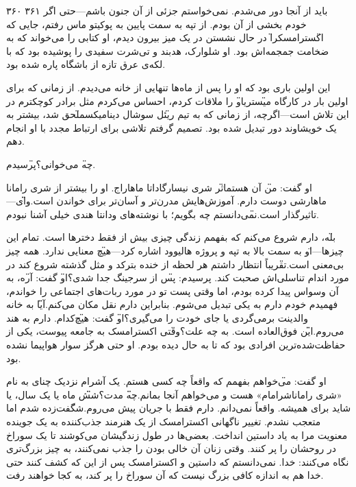 ۳۶۰  
۳۶۱  
باید از آنجا دور می‌شدم. نمی‌خواستم جزئی از آن جنون باشم—حتی اگر خودم بخشی از آن بودم. از تپه به سمت پایین به پوکیتو ماس رفتم، جایی که \"اکسترامسک\" را در حال نشستن در یک میز بیرون دیدم، او کتابی را می‌خواند که به ضخامت جمجمه‌اش بود. او شلوارک، هدبند و تی‌شرت سفیدی را پوشیده بود که با لکه‌ی عرق تازه از باشگاه پاره شده بود.

این اولین باری بود که او را پس از ماه‌ها تنهایی از خانه می‌دیدم. از زمانی که برای اولین بار در کارگاه \"میستری\" او را ملاقات کردم، احساس می‌کردم مثل برادر کوچکترم در این تلاش است—اگرچه، از زمانی که به تیم \"ریئل سوشال دینامیکس\" ملحق شد، بیشتر به یک خویشاوند دور تبدیل شده بود. تصمیم گرفتم تلاشی برای ارتباط مجدد با او انجام دهم.

\"چه می‌خوانی؟\" پرسیدم.

او گفت: \"من آن هستم\" اثر شری نیسارگاداتا ماهاراج. او را بیشتر از شری رامانا ماهارشی دوست دارم. آموزش‌هایش مدرن‌تر و آسان‌تر برای خواندن است.\"

\"وای—تاثیرگذار است.\" نمی‌دانستم چه بگویم؛ با نوشته‌های ودانتا هندی خیلی آشنا نبودم.

\"بله، دارم شروع می‌کنم که بفهمم زندگی چیزی بیش از فقط دخترها است. تمام این چیزها\"—او به سمت بالا به تپه و پروژه هالیوود اشاره کرد—\"هیچ معنایی ندارد. همه چیز بی‌معنی است.\"

تقریباً انتظار داشتم هر لحظه از خنده بترکد و مثل گذشته شروع کند در مورد اندام تناسلی‌اش صحبت کند. پرسیدم: \"پس از سرجینگ جدا شدی؟\"

او گفت: \"آره، به آن وسواس پیدا کرده بودم، اما وقتی پست تو در مورد ربات‌های اجتماعی را خواندم، فهمیدم خودم دارم به یکی تبدیل می‌شوم. بنابراین دارم نقل مکان می‌کنم.\"

\"آیا به خانه والدینت برمی‌گردی یا جای خودت را می‌گیری؟\"

او گفت: \"هیچ‌کدام. دارم به هند می‌روم.\"

\"این فوق‌العاده است. به چه علت؟\" وقتی اکسترامسک به جامعه پیوست، یکی از حفاظت‌شده‌ترین افرادی بود که تا به حال دیده بودم. او حتی هرگز سوار هواپیما نشده بود.

او گفت: \"می‌خواهم بفهمم که واقعاً چه کسی هستم. یک آشرام نزدیک چنای به نام «شری راماناشرامام» هست و می‌خواهم آنجا بمانم.\"

\"چه مدت؟\"

\"شش ماه یا یک سال، یا شاید برای همیشه. واقعاً نمی‌دانم. دارم فقط با جریان پیش می‌روم.\"

شگفت‌زده شدم اما متعجب نشدم. تغییر ناگهانی اکسترامسک از یک هنرمند جذب‌کننده به یک جوینده معنویت مرا به یاد داستین انداخت. بعضی‌ها در طول زندگیشان می‌کوشند تا یک سوراخ در روحشان را پر کنند. وقتی زنان آن خالی بودن را جذب نمی‌کنند، به چیز بزرگ‌تری نگاه می‌کنند: خدا. نمی‌دانستم که داستین و اکسترامسک پس از این که کشف کنند حتی خدا هم به اندازه کافی بزرگ نیست که آن سوراخ را پر کند، به کجا خواهند رفت.

